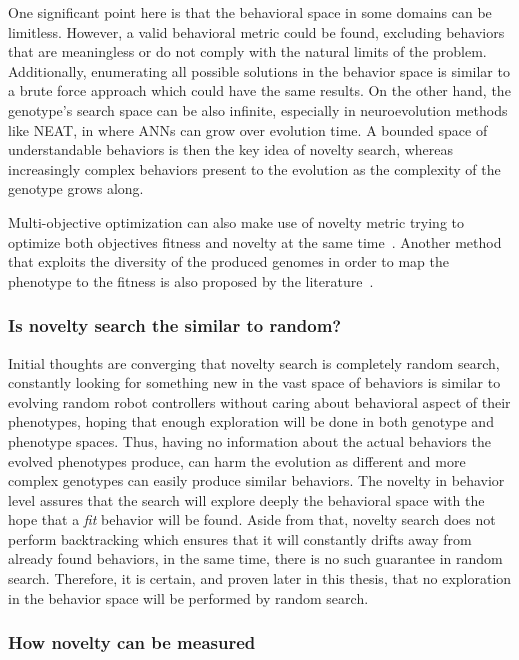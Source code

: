 One significant point here is that the behavioral space in some domains can be limitless. However, a valid behavioral metric could be found, excluding behaviors that are meaningless or do not comply with the natural limits of the problem. Additionally, enumerating all possible solutions in the behavior space is similar to a brute force approach which could have the same results. On the other hand, the genotype's search space can be also infinite, especially in neuroevolution methods like NEAT, in where ANNs can grow over evolution time. A bounded space of understandable behaviors is then the key idea of novelty search, whereas increasingly complex behaviors present to the evolution as the complexity of the genotype grows along.

Multi-objective optimization can also make use of novelty metric trying to optimize both objectives fitness and novelty at the same time~\cite{mouret2011novelty}. Another method that exploits the diversity of the produced genomes in order to map the phenotype to the fitness is also proposed by the literature~\cite{mouret2012algorithm}.

\subsubsection*{Is novelty search the similar to random?}

Initial thoughts are converging that novelty search is completely random search, constantly looking for something new in the vast space of behaviors is similar to evolving random robot controllers without caring about behavioral aspect of their phenotypes, hoping that enough exploration will be done in both genotype and phenotype spaces. Thus, having no information about the actual behaviors the evolved phenotypes produce, can harm the evolution as different and more complex genotypes can easily produce similar behaviors. The novelty in behavior level assures that the search will explore deeply the behavioral space with the hope that a \emph{fit} behavior will be found. Aside from that, novelty search does not perform backtracking which ensures that it will constantly drifts away from already found behaviors, in the same time, there is no such guarantee in random search. Therefore, it is certain, and proven later in this thesis, that no exploration in the behavior space will be performed by random search.



\subsubsection*{How novelty can be measured}

